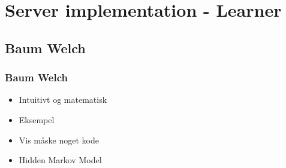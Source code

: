\section{Server implementation - Learner}
\subsection{Baum Welch}
\begin{frame}
	\frametitle{Baum Welch}
	\begin{itemize}
		\item Intuitivt og matematisk
		\item Eksempel
		\item Vis måske noget kode
		\item Hidden Markov Model
	\end{itemize}
\end{frame}